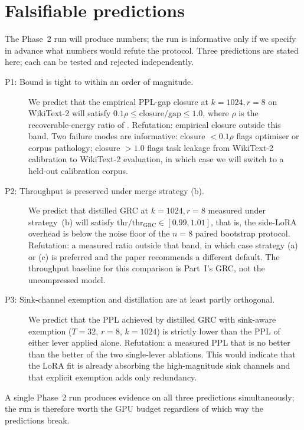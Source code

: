 \documentclass[11pt]{article}
\begin{document}
\section{Falsifiable predictions}
\label{sec:predictions}

The Phase~2 run will produce numbers; the run is informative only if we
specify in advance what numbers would refute the protocol. Three
predictions are stated here; each can be tested and rejected independently.

\begin{description}
\item[P1: Bound is tight to within an order of magnitude.]
We predict that the empirical PPL-gap closure at $k{=}1024, r{=}8$ on
WikiText-2 will satisfy $0.1\rho \le \text{closure}/\text{gap} \le 1.0$,
where $\rho$ is the recoverable-energy ratio of .
Refutation: empirical closure outside this band. Two failure modes are
informative: closure $<0.1\rho$ flags optimiser or corpus pathology;
closure $>1.0$ flags task leakage from WikiText-2 calibration to
WikiText-2 evaluation, in which case we will switch to a held-out
calibration corpus.

\item[P2: Throughput is preserved under merge strategy (b).]
We predict that distilled GRC at $k{=}1024, r{=}8$ measured under
strategy~(b) will satisfy $\text{thr} / \text{thr}_{\text{GRC}} \in [0.99, 1.01]$,
that is, the side-LoRA overhead is below the noise floor of the
$n{=}8$ paired bootstrap protocol. Refutation: a measured ratio outside
that band, in which case strategy (a) or (c) is preferred and the
paper recommends a different default. The throughput baseline for
this comparison is Part~I's GRC, not the uncompressed model.

\item[P3: Sink-channel exemption and distillation are at least
partly orthogonal.] We predict that the PPL achieved by distilled
GRC with sink-aware exemption ($T{=}32$, $r{=}8$, $k{=}1024$) is
strictly lower than the PPL of either lever applied alone.
Refutation: a measured PPL that is no better than the better of the
two single-lever ablations. This would indicate that the LoRA fit is
already absorbing the high-magnitude sink channels and that explicit
exemption adds only redundancy.
\end{description}

A single Phase~2 run produces evidence on all three predictions
simultaneously; the run is therefore worth the GPU budget regardless of
which way the predictions break.
\end{document}

